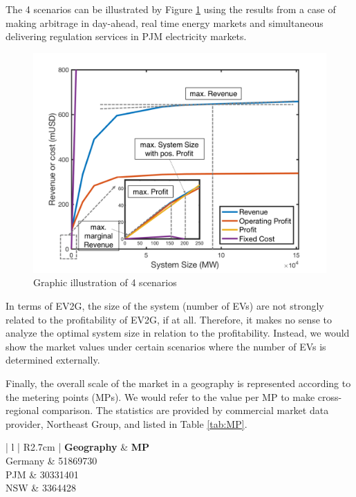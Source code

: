 The 4 scenarios can be illustrated by Figure \ref{fig:scenario-illustration} using the results from a case of making arbitrage in day-ahead, real time energy markets and simultaneous delivering regulation services in PJM electricity markets.
\begin{figure}[h!]
	\centering
	\includegraphics[width=0.95\linewidth]{Figures/Scenario_illustration}
	\caption{Graphic illustration of 4 scenarios}
	\label{fig:scenario-illustration}
\end{figure}

In terms of EV2G, the size of the system (number of EVs) are not strongly related to the profitability of EV2G, if at all. Therefore, it makes no sense to analyze the optimal system size in relation to the profitability. Instead, we would show the market values under certain scenarios where the number of EVs is determined externally. 

Finally, the overall scale of the market in a geography is represented according to the metering points (MPs). We would refer to the value per MP to make cross-regional comparison. The statistics are provided by commercial market data provider, Northeast Group\cite{NortheastGroup2016}\cite{NortheastGroup2017}\cite{NortheastGroup2017a}, and listed in Table \ref{tab:MP}.

\begin{table}
	\label{tab:MP}
	\centering
	\begin{tabular}{| l | R{2.7cm} |}
		\hline
		\textbf{Geography} & \textbf{MP} \\
		\hline
		\hline
		Germany & \num{51869730}\\
		PJM & \num{30331401}\\
		NSW & \num{3364428}\\
		\hline
	\end{tabular}
\caption{The number of metering points in each geography}
\end{table}

